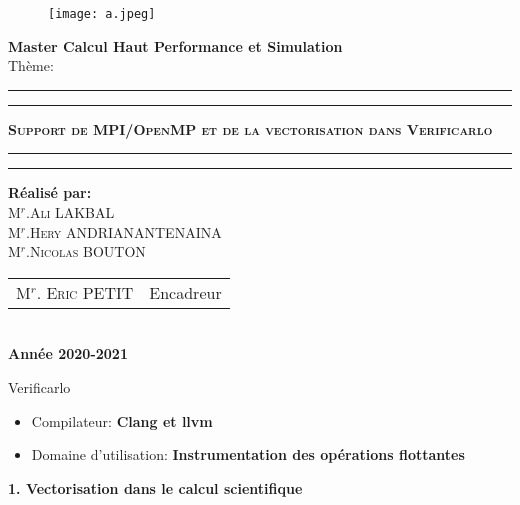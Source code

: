 \documentclass{beamer}
\begin{document}
\maketitle
\begin{center}
\begin{figure}[!htbp]
\begin{center}
\texttt{[image: a.jpeg]}
\end{center}
\end{figure}


{\Large {\bf { Master Calcul Haut Performance et Simulation }}}\\
{\huge {Thème:}}\\
\hrule
\hrule
{}
{\huge \textbf{\textsc{ Support de MPI/OpenMP et de la vectorisation dans Verificarlo}}}\\
\hrule
\hrule
{}
{\textbf{\Large{Réalisé par:}}}\\
{\large\textsc{M$^{r}$.Ali LAKBAL}}\\
{\large\textsc{M$^{r}$.Hery ANDRIANANTENAINA}}\\
{\large\textsc{M$^{r}$.Nicolas BOUTON}}\\
{\large
\begin{tabular}{ll}
M$^{r}$. \textsc{Eric} PETIT  & Encadreur    \\
\end{tabular}
}\\
{\Large\textbf{ Année 2020-2021}}
\end{center}

\begin{frame}{Verificarlo}
    \begin{itemize}
        \item Compilateur: \textbf{ Clang et llvm} 
        \item Domaine d'utilisation: \textbf{ Instrumentation des opérations flottantes}
    \end{itemize}
    
\textbf{1. Vectorisation dans le calcul scientifique}
    
\end{frame}
\end{document}
